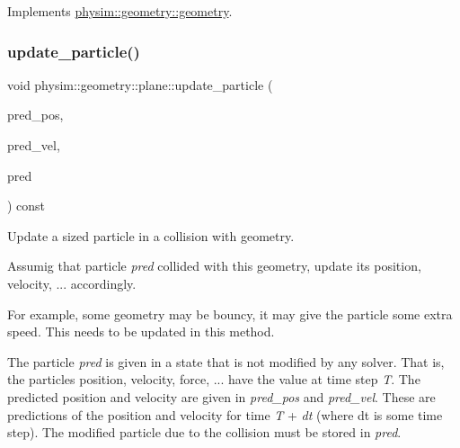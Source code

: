 Implements \hyperlink{classphysim_1_1geometry_1_1geometry_abbf5d7e5e0214d3c2cf95064f552928d}{physim\+::geometry\+::geometry}.

\mbox{\label{classphysim_1_1geometry_1_1plane_a9d72fc86446a0bcb46bfb344f40621ff}} 
\subsubsection{\texorpdfstring{update\+\_\+particle()}{update\_particle()}\hspace{0.1cm}{\footnotesize\ttfamily [2/2]}}
{\footnotesize\ttfamily void physim\+::geometry\+::plane\+::update\+\_\+particle (\begin{DoxyParamCaption}\item[{const \hyperlink{structphysim_1_1math_1_1vec3}{math\+::vec3} \&}]{pred\+\_\+pos,  }\item[{const \hyperlink{structphysim_1_1math_1_1vec3}{math\+::vec3} \&}]{pred\+\_\+vel,  }\item[{\hyperlink{classphysim_1_1particles_1_1sized__particle}{particles\+::sized\+\_\+particle} $\ast$}]{pred }\end{DoxyParamCaption}) const\hspace{0.3cm}{\ttfamily [virtual]}}



Update a sized particle in a collision with geometry. 

Assumig that particle {\itshape pred} collided with this geometry, update its position, velocity, ... accordingly.

For example, some geometry may be \textquotesingle{}bouncy\textquotesingle{}, it may give the particle some extra speed. This needs to be updated in this method.

The particle {\itshape pred} is given in a state that is not modified by any solver. That is, the particle\textquotesingle{}s position, velocity, force, ... have the value at time step {\itshape T}. The predicted position and velocity are given in {\itshape pred\+\_\+pos} and {\itshape pred\+\_\+vel}. These are predictions of the position and velocity for time {\itshape T} + {\itshape dt} (where dt is some time step). The modified particle due to the collision must be stored in {\itshape pred}.

